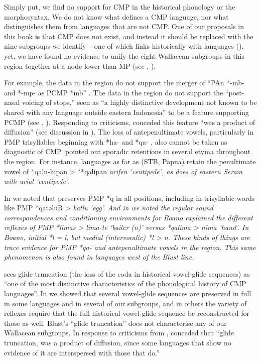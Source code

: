 Simply put,
we find no support for CMP in the historical phonology or the morphosyntax.
We do not know what defines a CMP language,
nor what distinguishes them from languages that are not CMP.
One of our proposals in this book is that CMP does not exist,
and instead it should be replaced with the nine subgroups we
identify -- one of which links historically with  languages ().
 yet, we have found no evidence to unify the eight Wallacean
subgroups in this region together at a node lower than MP
(see , ).

For example, the data in the region do not support the merger
of “PAn *-mb- and *-mp- as PCMP *mb” \citep[26]{Blust1981}.
The data in the region do not support the “post-nasal voicing
of stops,” seen as “a highly distinctive development not known
to be shared with any language outside eastern Indonesia” to
be a feature supporting PCMP (see \cite[94--98]{Blust2008}, \cite[72]{Blust2009}).
Responding to criticisms, \citet[72]{Blust2009} conceded this
feature “was a product of diffusion” (see discussion in ).
The loss of antepenultimate vowels,
particularly in PMP trisyllables beginning with *ha-
and *qa- \citep[263f]{Blust1993},
also cannot be taken as diagnostic of CMP.
\citet[123]{DonohueGrimes2008} pointed out sporadic retentions
in several etyma throughout the region.
For instance, languages as far  as
 (STB, Papua) retain the penultimate
vowel of *qalu-hipan > **qalipan \it{arifen} `centipede',
as does  of eastern Seram with \it{urial} `centipede'.

In  we noted that  preserves PMP *q in
all positions, including in trisyllabic words like PMP *qatəluR > \it{katlu} ‘egg’.
And in  we noted the regular sound correspondences
and conditioning environments for Boano explained the different
reflexes of PMP *limas > lima-te ‘bailer (n)’ versus *qalima > \it{nima} ‘hand’.
In Boano, initial *l = \it{l},
but medial (intervocalic) *l > \it{n}.
These kinds of things are trace evidence for PMP *qa-
and antepenultimate vowels in the region.
This same phenomenon is also found in languages west of the Blust line.

\citet[264ff]{Blust1993} sees glide truncation (the loss of the coda
in historical vowel-glide sequences) as “one of the most distinctive
characteristics of the phonological history of CMP languages”.
In  we showed that several vowel-glide sequences
are preserved in full in some languages
and in several of our subgroups,
and in others the variety of reflexes require that the full historical
vowel-glide sequence be reconstructed for those as well.
Blust’s “glide truncation” does not characterise any of our Wallacean subgroups.
In response to criticisms from \citet{DonohueGrimes2008},
\citet[72]{Blust2009} conceded that “glide truncation,
was a product of diffusion,
since some languages that show no evidence of it are interspersed
with those that do.”

